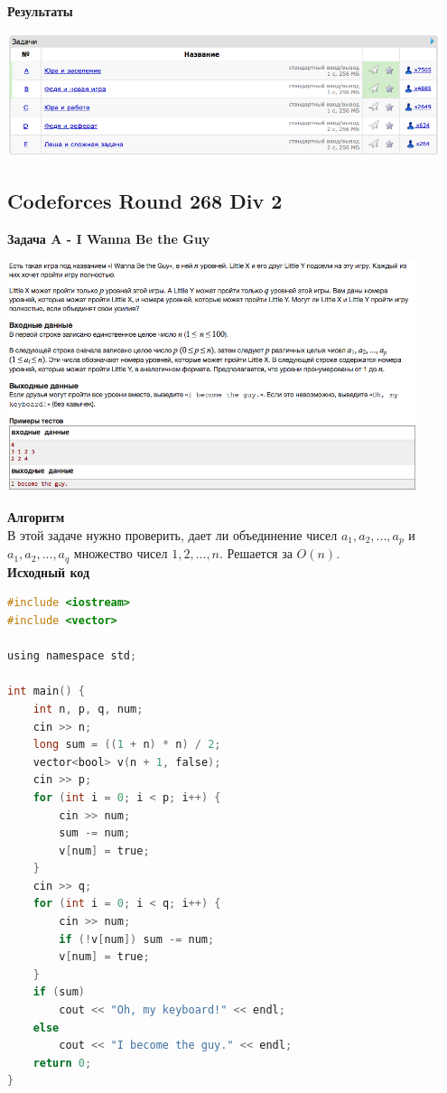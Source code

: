 \documentclass[a4paper,12pt]{article}
\begin{document}
\textbf{{\large Результаты}} \\
\begin{center}
\includegraphics[width=0.95\textwidth]{C_267/C_267_result.png}\\ [1cm]
\end{center}



%
%

\newpage
\subsection{Codeforces Round 268 Div 2}

\textbf{{\large Задача A - I Wanna Be the Guy}} \\
\begin{center}
\includegraphics[width=0.9\textwidth]{C_268/C_268_A.png}\\ [1cm]
\end{center}
\textbf{{\large Алгоритм}} \\
В этой задаче нужно проверить, дает ли объединение чисел $a_1, a_2, ... , a_p$ и $a_1, a_2, ... , a_q$ множество чисел $1, 2, ... , n$. Решается за $O(n)$.\\

\textbf{{\large Исходный код}}
\begin{lstlisting}[language=C]
#include <iostream>
#include <vector>

using namespace std;

int main() {
    int n, p, q, num;
    cin >> n;
    long sum = ((1 + n) * n) / 2;
    vector<bool> v(n + 1, false);
    cin >> p;
    for (int i = 0; i < p; i++) {
        cin >> num;
        sum -= num;
        v[num] = true;
    }
    cin >> q;
    for (int i = 0; i < q; i++) {
        cin >> num;
        if (!v[num]) sum -= num;
        v[num] = true;
    }
    if (sum)
        cout << "Oh, my keyboard!" << endl;
    else
        cout << "I become the guy." << endl;
    return 0;
}
\end{lstlisting}
\end{document}
